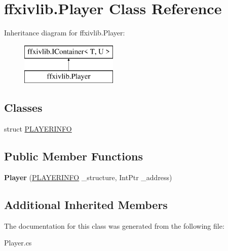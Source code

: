 \hypertarget{classffxivlib_1_1_player}{\section{ffxivlib.\-Player Class Reference}
\label{classffxivlib_1_1_player}
}
Inheritance diagram for ffxivlib.\-Player\-:\begin{figure}[H]
\begin{center}
\leavevmode
\includegraphics[height=2.000000cm]{classffxivlib_1_1_player}
\end{center}
\end{figure}
\subsection*{Classes}
\begin{DoxyCompactItemize}
\item 
struct \hyperlink{structffxivlib_1_1_player_1_1_p_l_a_y_e_r_i_n_f_o}{P\-L\-A\-Y\-E\-R\-I\-N\-F\-O}
\end{DoxyCompactItemize}
\subsection*{Public Member Functions}
\begin{DoxyCompactItemize}
\item 
\hypertarget{classffxivlib_1_1_player_a1ea21cf10a56fd9fef3bc4b0d54516bf}{{\bfseries Player} (\hyperlink{structffxivlib_1_1_player_1_1_p_l_a_y_e_r_i_n_f_o}{P\-L\-A\-Y\-E\-R\-I\-N\-F\-O} \-\_\-structure, Int\-Ptr \-\_\-address)}\label{classffxivlib_1_1_player_a1ea21cf10a56fd9fef3bc4b0d54516bf}

\end{DoxyCompactItemize}
\subsection*{Additional Inherited Members}


The documentation for this class was generated from the following file\-:\begin{DoxyCompactItemize}
\item 
Player.\-cs\end{DoxyCompactItemize}
